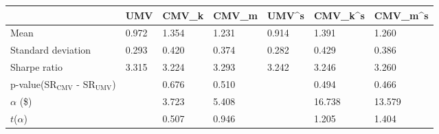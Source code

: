 \begin{tabular}{lllllll}
\toprule
 & UMV & CMV_k & CMV_m & UMV^s & CMV_k^s & CMV_m^s \\
\midrule
Mean & 0.972 & 1.354 & 1.231 & 0.914 & 1.391 & 1.260 \\
Standard deviation & 0.293 & 0.420 & 0.374 & 0.282 & 0.429 & 0.386 \\
Sharpe ratio & 3.315 & 3.224 & 3.293 & 3.242 & 3.246 & 3.260 \\
p-value(SR$_{\text{CMV}}$ - SR$_{\text{UMV}}$) &  & 0.676 & 0.510 &  & 0.494 & 0.466 \\
$\alpha$ (\$) &  & 3.723 & 5.408 &  & 16.738 & 13.579 \\
$t$($\alpha$) &  & 0.507 & 0.946 &  & 1.205 & 1.404 \\
\bottomrule
\end{tabular}
